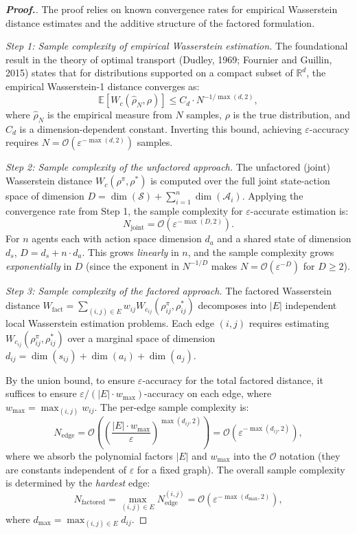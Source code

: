 \documentclass[12pt,a4paper,oneside]{report}
\theoremstyle{definition}
\theoremstyle{remark}
\begin{document}
\begin{proof}[\textbf{Proof.}]
The proof relies on known convergence rates for empirical Wasserstein distance estimates and the additive structure of the factored formulation.

\medskip
\noindent\textit{Step 1: Sample complexity of empirical Wasserstein estimation.}
The foundational result in the theory of optimal transport (Dudley, 1969; Fournier and Guillin, 2015) states that for distributions supported on a compact subset of $\mathbb{R}^d$, the empirical Wasserstein-1 distance converges as:
\[
\mathbb{E}\left[W_c(\hat{\rho}_N, \rho)\right] \leq C_d \cdot N^{-1/\max(d, 2)},
\]
where $\hat{\rho}_N$ is the empirical measure from $N$ samples, $\rho$ is the true distribution, and $C_d$ is a dimension-dependent constant. Inverting this bound, achieving $\varepsilon$-accuracy requires $N = \mathcal{O}(\varepsilon^{-\max(d, 2)})$ samples.

\medskip
\noindent\textit{Step 2: Sample complexity of the unfactored approach.}
The unfactored (joint) Wasserstein distance $W_c(\rho^\pi, \rho^*)$ is computed over the full joint state-action space of dimension $D = \dim(\mathcal{S}) + \sum_{i=1}^n \dim(\mathcal{A}_i)$. Applying the convergence rate from Step 1, the sample complexity for $\varepsilon$-accurate estimation is:
\[
N_{\text{joint}} = \mathcal{O}\left(\varepsilon^{-\max(D, 2)}\right).
\]
For $n$ agents each with action space dimension $d_a$ and a shared state of dimension $d_s$, $D = d_s + n \cdot d_a$. This grows \emph{linearly} in $n$, and the sample complexity grows \emph{exponentially} in $D$ (since the exponent in $N^{-1/D}$ makes $N = \mathcal{O}(\varepsilon^{-D})$ for $D \geq 2$).

\medskip
\noindent\textit{Step 3: Sample complexity of the factored approach.}
The factored Wasserstein distance $W_{\text{fact}} = \sum_{(i,j) \in E} w_{ij} W_{c_{ij}}(\rho^\pi_{ij}, \rho^*_{ij})$ decomposes into $|E|$ independent local Wasserstein estimation problems. Each edge $(i,j)$ requires estimating $W_{c_{ij}}(\rho^\pi_{ij}, \rho^*_{ij})$ over a marginal space of dimension $d_{ij} = \dim(s_{ij}) + \dim(a_i) + \dim(a_j)$.

By the union bound, to ensure $\varepsilon$-accuracy for the total factored distance, it suffices to ensure $\varepsilon / (|E| \cdot w_{\max})$-accuracy on each edge, where $w_{\max} = \max_{(i,j)} w_{ij}$. The per-edge sample complexity is:
\[
N_{\text{edge}} = \mathcal{O}\left(\left(\frac{|E| \cdot w_{\max}}{\varepsilon}\right)^{\max(d_{ij}, 2)}\right) = \mathcal{O}\left(\varepsilon^{-\max(d_{ij}, 2)}\right),
\]
where we absorb the polynomial factors $|E|$ and $w_{\max}$ into the $\mathcal{O}$ notation (they are constants independent of $\varepsilon$ for a fixed graph). The overall sample complexity is determined by the \emph{hardest} edge:
\[
N_{\text{factored}} = \max_{(i,j) \in E} N_{\text{edge}}^{(i,j)} = \mathcal{O}\left(\varepsilon^{-\max(d_{\text{max}}, 2)}\right),
\]
where $d_{\text{max}} = \max_{(i,j) \in E} d_{ij}$.


\end{proof}
\end{document}
